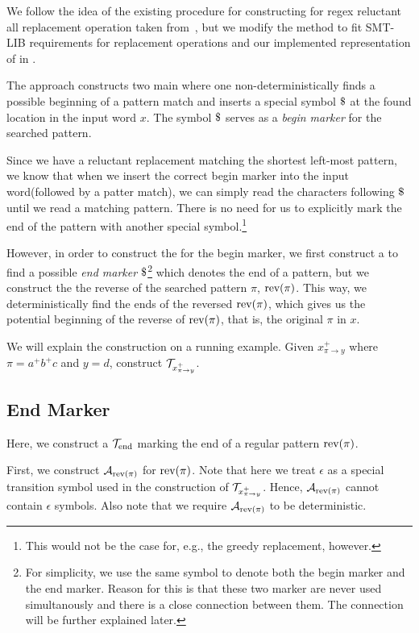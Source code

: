 We follow the idea of the existing procedure for constructing \nft for regex reluctant all replacement operation taken from~\cite{replace_nfts_model_ModelingRegularReplacementForStringConstraintSolving_DBLP:conf/nfm/FuL10}, but we modify the method to fit SMT-LIB requirements for replacement operations and our implemented representation of \nfts in \mata.

The approach constructs two main \nfts where one non-deterministically finds a possible beginning of a pattern match and inserts a special symbol $\marker$ at the found location in the input word $x$. The symbol $\marker$ serves as a \emph{begin marker} for the searched pattern.

Since we have a reluctant replacement matching the shortest left-most pattern, we know that when we insert the correct begin marker into the input word(followed by a patter match), we can simply read the characters following $\marker$ until we read a matching pattern. There is no need for us to explicitly mark the end of the pattern with another special symbol.\footnote{
  This would not be the case for, e.g., the greedy replacement, however.
}

However, in order to construct the \nft for the begin marker, we first construct a \dft to find a possible \emph{end marker} $\marker$\footnote{For simplicity, we use the same symbol to denote both the begin marker and the end marker. Reason for this is that these two marker are never used simultanously and there is a close connection between them. The connection will be further explained later.} which denotes the end of a pattern, but we construct the \nft the reverse of the searched pattern $\pi$, $\text{rev(}\pi\text{)}$.
This way, we deterministically find the ends of the reversed $\text{rev(}\pi\text{)}$, which gives us the potential beginning of the reverse of $\text{rev(}\pi\text{)}$, that is, the original $\pi$ in $x$.

We will explain the construction on a running example.
Given $x^{+}_{\pi \rightarrow y}$ where $\pi = a^+b^+c$ and $y = d$, construct $\mathcal{T}_{x^{+}_{\pi \rightarrow y}}$.

\subsection{End Marker \dft}
Here, we construct a \dft $\mathcal{T}_{\text{end}}$ marking the end of a regular pattern $\text{rev(}\pi\text{)}$.

First, we construct \dfa $\mathcal{A}_{\text{rev(}\pi\text{)}}$ for $\text{rev(}\pi\text{)}$.
Note that here we treat $\epsilon$ as a special transition symbol used in the construction of $\mathcal{T}_{x^{+}_{\pi \rightarrow y}}$.
Hence, $\mathcal{A}_{\text{rev(}\pi\text{)}}$ cannot contain $\epsilon$ symbols.
Also note that we require $\mathcal{A}_{\text{rev(}\pi\text{)}}$ to be deterministic.

